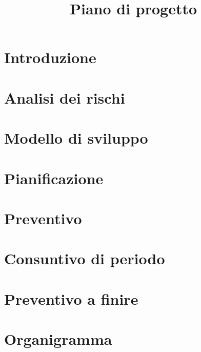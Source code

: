 \documentclass{article}
\title{Piano di progetto}
\begin{document}


\section{Introduzione}%
\label{sec:introduzione}

\newpage
\section{Analisi dei rischi}%
\label{sec:analisi_dei_rischi}

\newpage
\section{Modello di sviluppo}%
\label{sec:modello_di_sviluppo}

\newpage
\section{Pianificazione}%
\label{sec:pianificazione}

\newpage
\section{Preventivo}%
\label{sec:preventivo}

\newpage
\section{Consuntivo di periodo}%
\label{sec:consuntivo_di_periodo}

\section{Preventivo a finire}%
\label{sec:preventivo_a_finire}

\newpage
\appendix
\section{Organigramma}%
\label{sec:organigramma}

\end{document}
